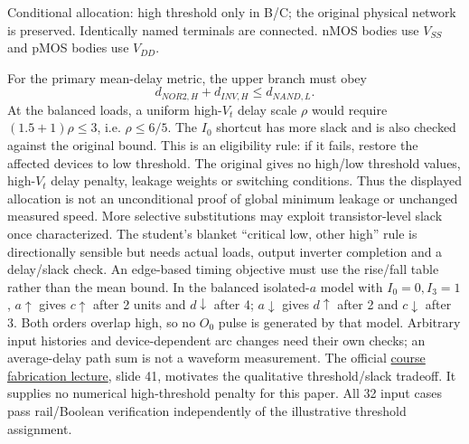 \documentclass[10pt]{article}
\newcommand{\mos}[4]{\begin{scope}[shift={(#1,#2)}]
\draw (0,.24)--(0,-.24);\draw (0,.20)--(.25,.20)--(.25,.5);
\draw (0,-.20)--(.25,-.20)--(.25,-.5);\draw (-.16,.23)--(-.16,-.23);
\ifnum#4=1\draw (-.26,0) circle (.06);\draw (-.75,0)--(-.32,0);\else\draw (-.75,0)--(-.16,0);\fi
\node[anchor=east,font=\scriptsize] at (-.76,0) {$#3$};\end{scope}}
\begin{document}
\begin{center}
\end{center}
\small Conditional allocation: high threshold only in B/C; the original physical network is preserved. Identically named terminals are connected. nMOS bodies use $V_{SS}$ and pMOS bodies use $V_{DD}$.\normalsize\par
\newpage
For the primary mean-delay metric, the upper branch must obey
\[d_{NOR2,H}+d_{INV,H}\le d_{NAND,L}.\]
At the balanced loads, a uniform high-$V_t$ delay scale $\rho$ would require $(1.5+1)\rho\le3$, i.e. $\rho\le6/5$. The $I_0$ shortcut has more slack and is also checked against the original bound. This is an eligibility rule: if it fails, restore the affected devices to low threshold.
The original gives no high/low threshold values, high-$V_t$ delay penalty, leakage weights or switching conditions. Thus the displayed allocation is not an unconditional proof of global minimum leakage or unchanged measured speed. More selective substitutions may exploit transistor-level slack once characterized. The student's blanket ``critical low, other high'' rule is directionally sensible but needs actual loads, output inverter completion and a delay/slack check.
An edge-based timing objective must use the rise/fall table rather than the mean bound. In the balanced isolated-$a$ model with $I_0=0,I_3=1$, $a\uparrow$ gives $c\uparrow$ after 2 units and $d\downarrow$ after 4; $a\downarrow$ gives $d\uparrow$ after 2 and $c\downarrow$ after 3. Both orders overlap high, so no $O_0$ pulse is generated by that model. Arbitrary input histories and device-dependent arc changes need their own checks; an average-delay path sum is not a waveform measurement.
The official \href{https://www.ee.ncu.edu.tw/jfli/public_html/VLSI/lecture/ch03.pdf}{course fabrication lecture}, slide 41, motivates the qualitative threshold/slack tradeoff. It supplies no numerical high-threshold penalty for this paper. All 32 input cases pass rail/Boolean verification independently of the illustrative threshold assignment.
\end{document}
